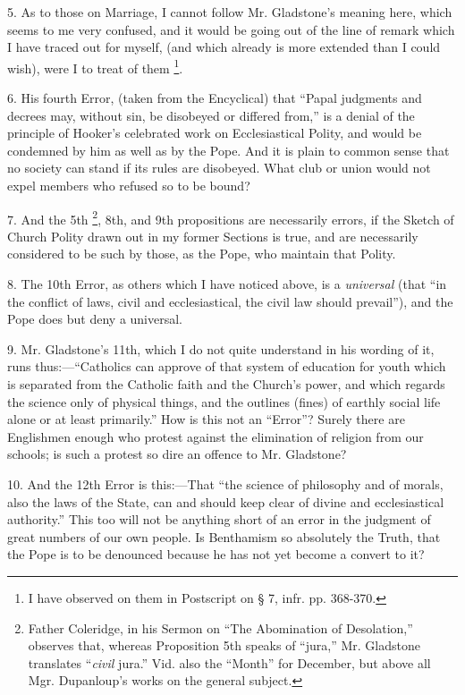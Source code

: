 5. As to those on Marriage, I cannot follow Mr. Gladstone's meaning
here, which seems to me very confused, and it would be going out of the
line of remark which I have traced out for myself, (and which already is
more extended than I could wish), were I to treat of them \footnote{I have observed on them in Postscript on § 7,
infr. pp. 368-370.}.

6. His fourth Error, (taken from the Encyclical) that ``Papal
judgments and decrees may, without sin, be disobeyed or differed
from,'' is a denial of the principle of Hooker's celebrated work on
Ecclesiastical Polity, and would be condemned by him as well as by the
Pope. And it is plain to common sense that no society can stand if its
rules are disobeyed. What club or union would not expel members who
refused so to be bound?

7. And the 5th \footnote{Father Coleridge, in his Sermon on ``The
Abomination of Desolation,'' observes that, whereas Proposition 5th
speaks of ``jura,'' Mr. Gladstone translates ``\emph{civil}
jura.'' Vid. also the ``Month'' for December, but above all
Mgr. Dupanloup's works on the general subject.}, 8th, and
9th propositions are necessarily errors, if the Sketch of Church
Polity drawn out in my former Sections is true, and are necessarily
considered to be such by those, as the Pope, who maintain that Polity.

8. The 10th Error, as others which I have noticed above, is a \emph{universal}
(that ``in the conflict of laws, civil and ecclesiastical, the civil
law should prevail''), and the Pope does but deny a universal.

9. Mr. Gladstone's 11th, which I do not quite understand in his
wording of it, runs thus:—``Catholics can approve of that system
of education for youth which is separated from the Catholic faith and
the Church's power, and which regards the science only of physical
things, and the outlines (fines) of earthly social life alone or at
least primarily.'' How is this not an ``Error''? Surely
there are Englishmen enough who protest against the elimination of
religion from our schools; is such a protest so dire an offence to Mr.
Gladstone?

10. And the 12th Error is this:—That ``the science of
philosophy and of morals, also the laws of the State, can and should
keep clear of divine and ecclesiastical authority.'' This too will
not be anything short of an error in the judgment of great numbers of
our own people. Is Benthamism so absolutely the Truth, that the Pope is
to be denounced because he has not yet become a convert to it?

